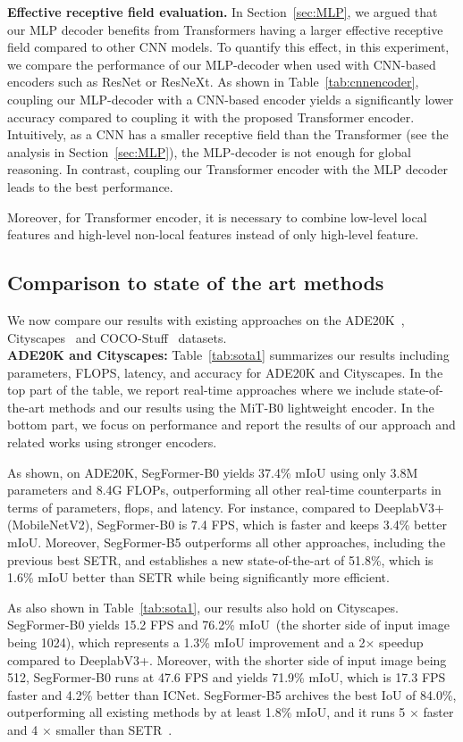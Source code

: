 \textbf{Effective receptive field evaluation.} In Section~\ref{sec:MLP}, we argued that our MLP decoder benefits from Transformers having a larger effective receptive field compared to other CNN models. To quantify this effect, in this experiment, we compare the performance of our MLP-decoder when used with CNN-based encoders such as ResNet or ResNeXt. As shown in Table~\ref{tab:cnnencoder}, coupling our MLP-decoder with a CNN-based encoder yields a significantly lower accuracy compared to coupling it with the proposed Transformer encoder. Intuitively, as a CNN has a smaller receptive field than the Transformer (see the analysis in Section~\ref{sec:MLP}), the MLP-decoder is not enough for global reasoning. In contrast, coupling our Transformer encoder with the MLP decoder leads to the best performance. 

Moreover, for Transformer encoder, it is necessary to combine low-level local features and high-level non-local features instead of only high-level feature. 

\subsection{Comparison to state of the art methods} We now compare our results with existing approaches on the ADE20K~\cite{ade20k}, Cityscapes~\cite{cityscape} and COCO-Stuff~\cite{cocostuff} datasets. 
\\ \textbf{ADE20K and Cityscapes:} 
Table~\ref{tab:sota1} summarizes our results including parameters, FLOPS, latency, and accuracy for ADE20K and Cityscapes. In the top part of the table, we report real-time approaches where we include state-of-the-art methods and our results using the MiT-B0 lightweight encoder. In the bottom part, we focus on performance and report the results of our approach and related works using stronger encoders.  

As shown, on ADE20K, SegFormer-B0 yields 37.4\% mIoU using only 3.8M parameters and 8.4G FLOPs, outperforming all other real-time counterparts in terms of parameters, flops, and latency. For instance, compared to DeeplabV3+ (MobileNetV2), SegFormer-B0 is 7.4 FPS, which is faster and keeps 3.4\% better mIoU. Moreover, SegFormer-B5 outperforms all other approaches, including the previous best SETR, and establishes a new state-of-the-art of 51.8\%, which is 1.6\% mIoU better than SETR while being significantly more efficient.

As also shown in Table~\ref{tab:sota1}, our results also hold on Cityscapes. SegFormer-B0 yields 15.2 FPS and 76.2\% mIoU~(the shorter side of input image being 1024), which represents a 1.3\% mIoU improvement and a 2$\times$ speedup compared to DeeplabV3+. Moreover, with the shorter side of input image being 512, SegFormer-B0 runs at 47.6 FPS and yields 71.9\% mIoU, which is 17.3 FPS faster and 4.2\% better than ICNet. SegFormer-B5 archives the best IoU of 84.0\%, outperforming all existing methods by at least 1.8\% mIoU, and it runs 5 $\times$ faster and 4 $\times$ smaller than SETR~\cite{setr}.

